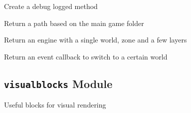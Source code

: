 \documentclass[letterpaper,10pt,english]{sphinxmanual}
\begin{document}

\begin{fulllineitems}
\label{blocks:serge.blocks.utils.debugMethod}
Create a debug logged method

\end{fulllineitems}


\begin{fulllineitems}
\label{blocks:serge.blocks.utils.getGamePath}
Return a path based on the main game folder

\end{fulllineitems}


\begin{fulllineitems}
\label{blocks:serge.blocks.utils.getSimpleSetup}
Return an engine with a single world, zone and a few layers

\end{fulllineitems}


\begin{fulllineitems}
\label{blocks:serge.blocks.utils.worldCallback}
Return an event callback to switch to a certain world

\end{fulllineitems}



\subsection{\texttt{visualblocks} Module}
\label{blocks:visualblocks-module}\label{blocks:module-serge.blocks.visualblocks}
Useful blocks for visual rendering
\end{document}
